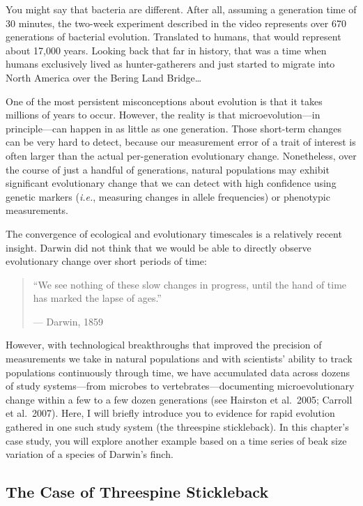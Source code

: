 \documentclass[
]{book}
\begin{document}
You might say that bacteria are different. After all, assuming a generation time of 30 minutes, the two-week experiment described in the video represents over 670 generations of bacterial evolution. Translated to humans, that would represent about 17,000 years. Looking back that far in history, that was a time when humans exclusively lived as hunter-gatherers and just started to migrate into North America over the Bering Land Bridge\ldots{}

One of the most persistent misconceptions about evolution is that it takes millions of years to occur. However, the reality is that microevolution---in principle---can happen in as little as one generation. Those short-term changes can be very hard to detect, because our measurement error of a trait of interest is often larger than the actual per-generation evolutionary change. Nonetheless, over the course of just a handful of generations, natural populations may exhibit significant evolutionary change that we can detect with high confidence using genetic markers (\emph{i.e.}, measuring changes in allele frequencies) or phenotypic measurements.

The convergence of ecological and evolutionary timescales is a relatively recent insight. Darwin did not think that we would be able to directly observe evolutionary change over short periods of time:

\begin{quote}
``We see nothing of these slow changes in progress, until the hand of time has marked the lapse of ages.''

--- Darwin, 1859
\end{quote}

However, with technological breakthroughs that improved the precision of measurements we take in natural populations and with scientists' ability to track populations continuously through time, we have accumulated data across dozens of study systems---from microbes to vertebrates---documenting microevolutionary change within a few to a few dozen generations (see Hairston et al.~2005; Carroll et al.~2007). Here, I will briefly introduce you to evidence for rapid evolution gathered in one such study system (the threespine stickleback). In this chapter's case study, you will explore another example based on a time series of beak size variation of a species of Darwin's finch.

\hypertarget{the-case-of-threespine-stickleback}{%
\subsection{The Case of Threespine Stickleback}\label{the-case-of-threespine-stickleback}}
\end{document}
